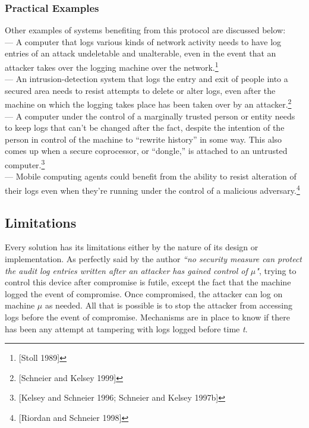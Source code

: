 \documentclass[12pt, letter]{article}
\begin{document}
\subsubsection{Practical Examples}

Other examples of systems benefiting from this protocol are discussed below:\\

— A computer that logs various kinds of network activity needs to have log entries of an attack undeletable and unalterable, even in the event that an attacker takes over the logging machine over the network.\footnote{[Stoll 1989]}\\

— An intrusion-detection system that logs the entry and exit of people into a secured area needs to resist attempts to delete or alter logs, even after the machine on which the logging takes place has been taken over by an attacker.\footnote{[Schneier and Kelsey 1999]}\\

— A computer under the control of a marginally trusted person or entity needs to keep logs that can’t be changed after the fact, despite the intention of the person in control of the machine to “rewrite history” in some way. This also comes up when a secure coprocessor, or “dongle,” is attached to an untrusted computer.\footnote{[Kelsey and Schneier 1996; Schneier and Kelsey 1997b]}\\

— Mobile computing agents could benefit from the ability to resist alteration of their logs even when they’re running under the control of a malicious adversary.\footnote{[Riordan and Schneier 1998]}


\subsection{Limitations}

Every solution has its limitations either by the nature of its design or implementation. As perfectly said by the author \textit{``no security measure can protect the audit log entries written after an attacker has gained control of $\mu$"}, trying to control this device after compromise is futile, except the fact that the machine logged the event of compromise. Once compromised, the attacker can log on machine $\mu$ as needed. All that is possible is to stop the attacker from accessing logs before the event of compromise. Mechanisms are in place to know if there has been any attempt at tampering with logs logged before time \textit{t}.\\
\end{document}
